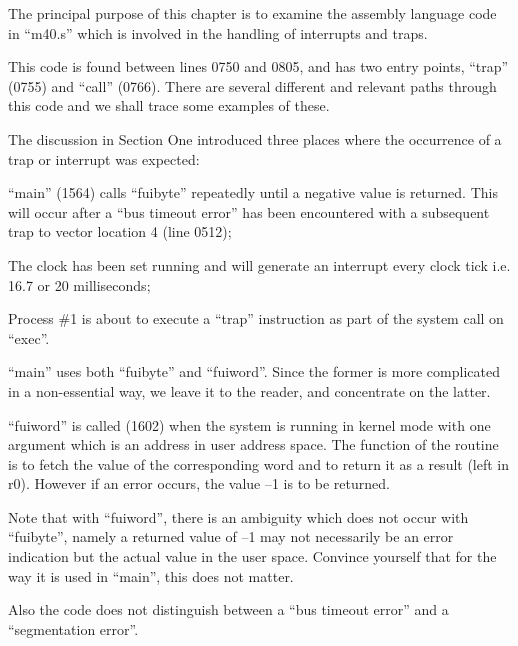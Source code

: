 %
%

The principal purpose of this chapter
is to examine the assembly language
code in ``m40.s'' which is involved in
the handling of interrupts and traps.

This code is found between lines 0750
and 0805, and has two entry points,
``trap'' (0755) and ``call'' (0766). There
are several different and relevant
paths through this code and we shall
trace some examples of these.


The discussion in Section One introduced three places where the occurrence
of a trap or interrupt was expected:

\bd
\item[(a)] ``main'' (1564) calls ``fuibyte''
 repeatedly until a negative
 value is returned. This will
 occur after a ``bus timeout
 error'' has been encountered with
 a subsequent trap to vector
 location 4 (line 0512);

\item[(b)] The clock has been set running
 and will generate an interrupt
 every clock tick i.e. 16.7 or 20
 milliseconds;

\item[(c)] Process \#1 is about to execute a
 ``trap'' instruction as part of
 the system call on ``exec''.
\ed



``main'' uses both ``fuibyte'' and ``fuiword''.
Since the former is more complicated in a non-essential way, we leave
it to the reader, and concentrate on the latter.

``fuiword'' is called (1602) when the
system is running in kernel mode with
one argument which is an address in
user address space. The function of the
routine is to fetch the value of the
corresponding word and to return it as
a result (left in r0). However if an
error occurs, the value --1 is to be
returned.

Note that with ``fuiword'', there is an
ambiguity which does not occur with
``fuibyte'', namely a returned value of
--1 may not necessarily be an error
indication but the actual value in the
user space. Convince yourself that for
the way it is used in ``main'', this does
not matter.

Also the code does not distinguish
between a ``bus timeout error'' and a
``segmentation error''.

